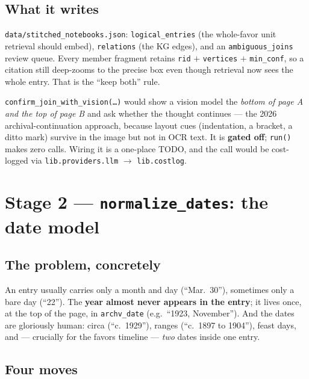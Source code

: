 \documentclass[11pt]{article}
\newcommand{\code}[1]{\texttt{\small #1}}
\begin{document}
\subsection{What it writes}

\code{data/stitched\_notebooks.json}: \code{logical\_entries} (the whole-favor unit retrieval should
embed), \code{relations} (the KG edges), and an \code{ambiguous\_joins} review queue. Every member
fragment retains \code{rid} $+$ \code{vertices} $+$ \code{min\_conf}, so a citation still deep-zooms to
the precise box even though retrieval now sees the whole entry. That is the ``keep both'' rule.

\begin{primerbox}
\code{confirm\_join\_with\_vision(\ldots)} would show a vision model the \emph{bottom of page A and the
top of page B} and ask whether the thought continues --- the 2026 archival-continuation approach,
because layout cues (indentation, a bracket, a ditto mark) survive in the image but not in OCR text.
It is \textbf{gated off}; \code{run()} makes zero calls. Wiring it is a one-place TODO, and the call
would be cost-logged via \code{lib.providers.llm} $\to$ \code{lib.costlog}.
\end{primerbox}

\section{Stage 2 --- \texttt{normalize\_dates}: the date model}

\subsection{The problem, concretely}

An entry usually carries only a month and day (``Mar.\ 30''), sometimes only a bare day (``22''). The
\textbf{year almost never appears in the entry}; it lives once, at the top of the page, in
\code{archv\_date} (e.g.\ ``1923, November''). And the dates are gloriously human: circa
(``c.\ 1929''), ranges (``c.\ 1897 to 1904''), feast days, and --- crucially for the favors timeline
--- \emph{two} dates inside one entry.

\subsection{Four moves}
\end{document}
